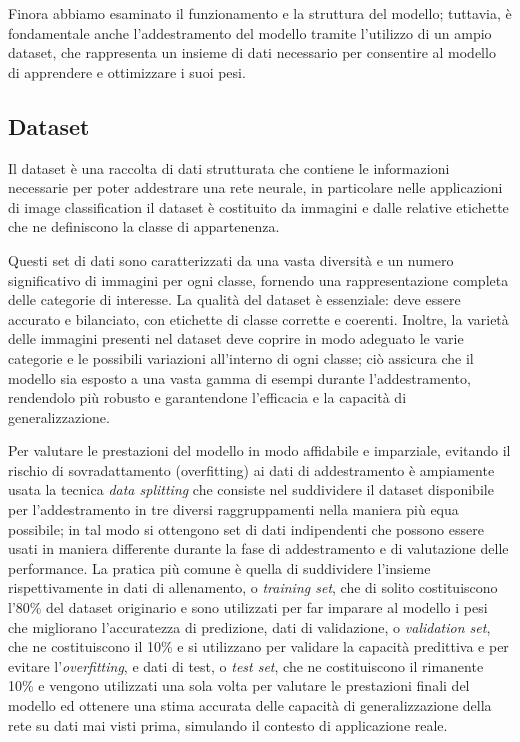 Finora abbiamo esaminato il funzionamento e la struttura del modello; tuttavia, è fondamentale anche l'addestramento del modello tramite l'utilizzo di un ampio dataset, che rappresenta un insieme di dati necessario per consentire al modello di apprendere e ottimizzare i suoi pesi.


\subsection{Dataset} %

Il dataset è una raccolta di dati strutturata che contiene le informazioni necessarie per poter addestrare una rete neurale, in particolare nelle applicazioni di image classification il dataset è costituito da immagini e dalle relative etichette che ne definiscono la classe di appartenenza.

Questi set di dati sono caratterizzati da una vasta diversità e un numero significativo di immagini per ogni classe, fornendo una rappresentazione completa delle categorie di interesse. La qualità del dataset è essenziale: deve essere accurato e bilanciato, con etichette di classe corrette e coerenti. Inoltre, la varietà delle immagini presenti nel dataset deve coprire in modo adeguato le varie categorie e le possibili variazioni all'interno di ogni classe; ciò assicura che il modello sia esposto a una vasta gamma di esempi durante l'addestramento, rendendolo più robusto e garantendone l'efficacia e la capacità di generalizzazione.

Per valutare le prestazioni del modello in modo affidabile e imparziale, evitando il rischio di sovradattamento (overfitting) ai dati di addestramento è ampiamente usata la tecnica \textit{data splitting} che consiste nel suddividere il dataset disponibile per l'addestramento in tre diversi raggruppamenti nella maniera più equa possibile; in tal modo si ottengono set di dati indipendenti che possono essere usati in maniera differente durante la fase di addestramento e di valutazione delle performance.
La pratica più comune è quella di suddividere l'insieme rispettivamente in dati di allenamento, o \textit{training set}, che di solito costituiscono l'80\% del dataset originario e sono utilizzati per far imparare al modello i pesi che migliorano l'accuratezza di predizione, dati di validazione, o \textit{validation set}, che ne costituiscono il 10\% e si utilizzano per validare la capacità predittiva e per evitare l'\textit{overfitting}, e dati di test, o \textit{test set}, che ne costituiscono il rimanente 10\% e vengono utilizzati una sola volta per valutare le prestazioni finali del modello ed ottenere una stima accurata delle capacità di generalizzazione della rete su dati mai visti prima, simulando il contesto di applicazione reale.


